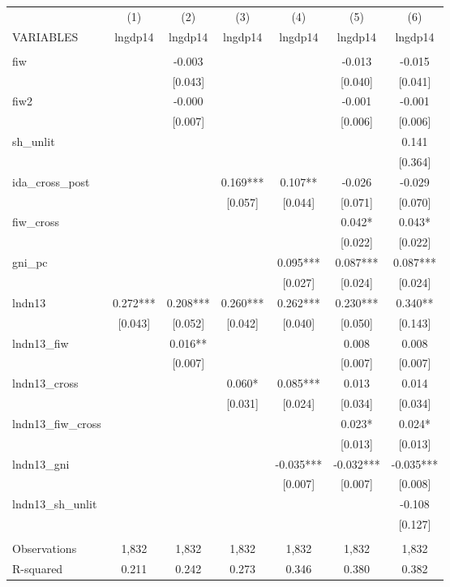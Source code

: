 \begin{tabular}{lcccccc} \hline
 & (1) & (2) & (3) & (4) & (5) & (6) \\
VARIABLES & lngdp14 & lngdp14 & lngdp14 & lngdp14 & lngdp14 & lngdp14 \\ \hline
 &  &  &  &  &  &  \\
fiw &  & -0.003 &  &  & -0.013 & -0.015 \\
 &  & [0.043] &  &  & [0.040] & [0.041] \\
fiw2 &  & -0.000 &  &  & -0.001 & -0.001 \\
 &  & [0.007] &  &  & [0.006] & [0.006] \\
sh\_unlit &  &  &  &  &  & 0.141 \\
 &  &  &  &  &  & [0.364] \\
ida\_cross\_post &  &  & 0.169*** & 0.107** & -0.026 & -0.029 \\
 &  &  & [0.057] & [0.044] & [0.071] & [0.070] \\
fiw\_cross &  &  &  &  & 0.042* & 0.043* \\
 &  &  &  &  & [0.022] & [0.022] \\
gni\_pc &  &  &  & 0.095*** & 0.087*** & 0.087*** \\
 &  &  &  & [0.027] & [0.024] & [0.024] \\
lndn13 & 0.272*** & 0.208*** & 0.260*** & 0.262*** & 0.230*** & 0.340** \\
 & [0.043] & [0.052] & [0.042] & [0.040] & [0.050] & [0.143] \\
lndn13\_fiw &  & 0.016** &  &  & 0.008 & 0.008 \\
 &  & [0.007] &  &  & [0.007] & [0.007] \\
lndn13\_cross &  &  & 0.060* & 0.085*** & 0.013 & 0.014 \\
 &  &  & [0.031] & [0.024] & [0.034] & [0.034] \\
lndn13\_fiw\_cross &  &  &  &  & 0.023* & 0.024* \\
 &  &  &  &  & [0.013] & [0.013] \\
lndn13\_gni &  &  &  & -0.035*** & -0.032*** & -0.035*** \\
 &  &  &  & [0.007] & [0.007] & [0.008] \\
lndn13\_sh\_unlit &  &  &  &  &  & -0.108 \\
 &  &  &  &  &  & [0.127] \\
 &  &  &  &  &  &  \\
Observations & 1,832 & 1,832 & 1,832 & 1,832 & 1,832 & 1,832 \\
R-squared & 0.211 & 0.242 & 0.273 & 0.346 & 0.380 & 0.382 \\

\end{tabular}
